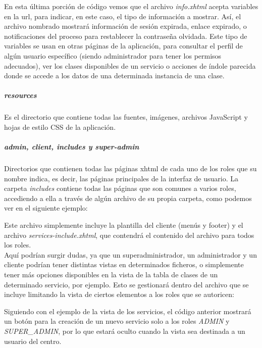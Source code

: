 

En esta última porción de código vemos que el archivo \textit{info.xhtml} acepta variables en la url, para indicar, en este caso, el tipo de información a mostrar. Así, el archivo nombrado mostrará información de sesión expirada, enlace expirado, o notificaciones del proceso para restablecer la contraseña olvidada. Este tipo de variables se usan en otras páginas de la aplicación, para consultar el perfil de algún usuario específico (siendo administrador para tener los permisos adecuados), ver los clases disponibles de un servicio o acciones de índole parecida donde se accede a los datos de una determinada instancia de una clase. 


\subparagraph{\textit{resources}}

Es el directorio que contiene todas las fuentes, imágenes, archivos JavaScript y hojas de estilo CSS de la aplicación. 


\subparagraph{\textit{admin, client, includes }y \textit{super-admin}}

Directorios que contienen todas las páginas xhtml de cada uno de los roles que su nombre indica, es decir, las páginas principales de la interfaz de usuario. La carpeta \textit{includes} contiene todas las páginas que son comunes a varios roles, accediendo a ella a través de algún archivo de su propia carpeta, como podemos ver en el siguiente ejemplo: 



Este archivo simplemente incluye la plantilla del cliente (menús y footer) y el archivo \textit{services-include.xhtml}, que contendrá el contenido del archivo para todos los roles.\\ 

Aquí podrían surgir dudas, ya que un superadministrador, un administrador y un cliente podrían tener distintas vistas en determinados ficheros, o simplemente tener más opciones disponibles en la vista de la tabla de clases de un determinado servicio, por ejemplo. Esto se gestionará dentro del archivo que se incluye limitando la vista de ciertos elementos a los roles que se autoricen: 



Siguiendo con el ejemplo de la vista de los servicios, el código anterior mostrará un botón para la creación de un nuevo servicio solo a los roles \textit{ADMIN} y \textit{SUPER\_ADMIN}, por lo que estará oculto cuando la vista sea destinada a un usuario del centro. \\

